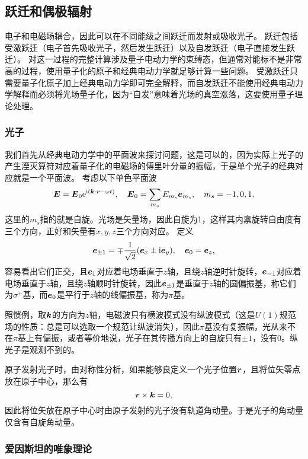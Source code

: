 \documentclass[UTF8, a4paper]{ctexart}
\newcommand*{\ee}{\mathrm{e}}
\newcommand*{\ii}{\mathrm{i}}
\begin{document}
\subsection{跃迁和偶极辐射}\label{sec:electro-dipole}

电子和电磁场耦合，因此可以在不同能级之间跃迁而发射或吸收光子。
跃迁包括受激跃迁（电子首先吸收光子，然后发生跃迁）以及自发跃迁（电子直接发生跃迁）。
对这一过程的完整计算涉及量子电动力学的束缚态，但通常对能标不是非常高的过程，使用量子化的原子和经典电动力学就足够计算一些问题。
受激跃迁只需要量子化原子加上经典电动力学即可完全解释，而自发跃迁不能使用经典电动力学解释而必须将光场量子化，因为“自发”意味着光场的真空涨落，这要使用量子理论处理。

\subsubsection{光子}

我们首先从经典电动力学中的平面波来探讨问题，这是可以的，因为实际上光子的产生湮灭算符对应着量子化的电磁场的傅里叶分量的振幅，于是单个光子的经典对应就是一个平面波。
考虑以下单色平面波
\begin{equation}
    \vb*{E} = \vb*{E}_0 \ee^{\ii(\vb*{k} \cdot \vb*{r} - \omega t)}, \quad \vb*{E}_0 = \sum_{m_s} E_{m_s} \vb*{e}_{m_s}, \quad m_s = -1, 0, 1,
\end{equation}
这里的$m_s$指的就是自旋。光场是矢量场，因此自旋为1，这样其内禀旋转自由度有三个方向，正好和矢量有$x, y, z$三个方向对应。
定义
\begin{equation}
    \vb*{e}_{\pm 1} = \mp \frac{1}{\sqrt{2}} (\vb*{e}_x \pm \ii \vb*{e}_y), \quad \vb*{e}_0 = \vb*{e}_z,
\end{equation}
容易看出它们正交，且$\vb*{e}_1$对应着电场垂直于$z$轴，且绕$z$轴逆时针旋转，$\vb*{e}_{-1}$对应着电场垂直于$z$轴，且绕$z$轴顺时针旋转，因此$\vb*{e}_{\pm 1}$是垂直于$z$轴的圆偏振基，称它们为$\sigma^\pm$基，而$\vb*{e}_0$是平行于$z$轴的线偏振基，称为$\pi$基。

照惯例，取$\vb*{k}$的方向为$z$轴，电磁波只有横波模式没有纵波模式（这是$U(1)$规范场的性质：总是可以选取一个规范让纵波消失），因此$\pi$基没有复振幅，光从来不在$\pi$基上有偏振，或者等价地说，光子在其传播方向上的自旋只有$\pm 1$，没有$0$。纵光子是观测不到的。

原子发射光子时，由对称性分析，如果能够良定义一个光子位置$\vb*{r}$，且将位矢零点放在原子中心，那么有
\[
    \vb*{r} \times \vb*{k} = 0,
\]
因此将位矢放在原子中心时由原子发射的光子没有轨道角动量。于是光子的角动量仅含有自旋角动量。

\subsubsection{爱因斯坦的唯象理论}\label{sec:einstein-phonomenon}
\end{document}
